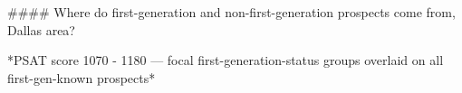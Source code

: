 #### Where do first-generation and non-first-generation prospects come from, Dallas area?

*PSAT score 1070 - 1180 — focal first-generation-status groups overlaid on all first-gen-known prospects*
